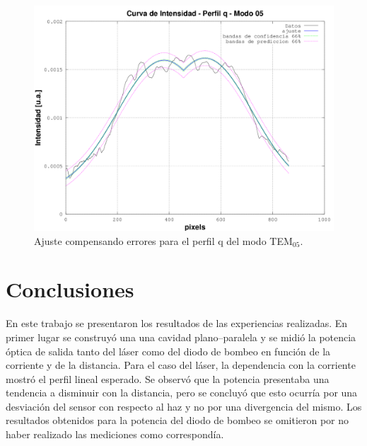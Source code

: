 \documentclass[10pt, a4paper]{article}%
\begin{document}
\begin{multicols}{2}
\begin{figure}[H]
    \includegraphics[scale=0.35]{Graficos/plt_ajuste_tem05_perfil_q.png}
    \caption{Ajuste compensando errores para el perfil q del modo TEM$_{05}$.}
    \label{fig:ajuste_malo_modo_tem05}
\end{figure}


\section*{Conclusiones}
En este trabajo se presentaron los resultados de las experiencias realizadas. En primer lugar se construyó una una cavidad plano--paralela y se midió la potencia óptica de salida tanto del láser como del diodo de bombeo en función de la corriente y de la distancia. Para el caso del láser, la dependencia con la corriente mostró el perfil lineal esperado. Se observó que la potencia presentaba una tendencia a disminuir con la distancia, pero se concluyó que esto ocurría por una desviación del sensor con respecto al haz y no por una divergencia del mismo. Los resultados obtenidos para la potencia del diodo de bombeo se omitieron por no haber realizado las mediciones como correspondía. 



\end{multicols}
\end{document}
